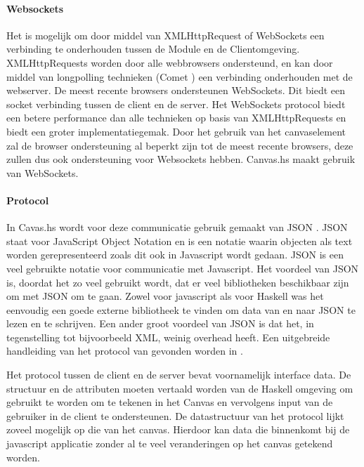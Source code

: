 \paragraph{Websockets}
Het is mogelijk om door middel van XMLHttpRequest of WebSockets een verbinding te onderhouden tussen de Module en de Clientomgeving. XMLHttpRequests worden door alle webbrowsers ondersteund, en kan door middel van longpolling technieken (Comet \cite{comet2007}) een verbinding onderhouden met de webserver. De meest recente browsers ondersteunen WebSockets. Dit biedt een socket verbinding tussen de client en de server. Het WebSockets protocol biedt een betere performance dan alle technieken op basis van XMLHttpRequests en biedt een groter implementatiegemak. Door het gebruik van het canvaselement zal de browser ondersteuning al beperkt zijn tot de meest recente browsers, deze zullen dus ook ondersteuning voor Websockets hebben. Canvas.hs maakt gebruik van WebSockets.

\paragraph{Protocol}
In Cavas.hs wordt voor deze communicatie gebruik gemaakt van JSON \cite{JSON2006}. JSON staat voor JavaScript Object Notation en is een notatie waarin objecten als text worden gerepresenteerd zoals dit ook in Javascript wordt gedaan. JSON is een veel gebruikte notatie voor communicatie met Javascript. Het voordeel van JSON is, doordat het zo veel gebruikt wordt, dat er veel bibliotheken beschikbaar zijn om met JSON om te gaan. Zowel voor javascript als voor Haskell was het eenvoudig een goede externe bibliotheek te vinden om data van en naar JSON te lezen en te schrijven. Een ander groot voordeel van JSON is dat het, in tegenstelling tot bijvoorbeeld XML, weinig overhead heeft. Een uitgebreide handleiding van het protocol van gevonden worden in \cite{Protocol2013}.

Het protocol tussen de client en de server bevat voornamelijk interface data. De structuur en de attributen moeten vertaald worden van de Haskell omgeving om gebruikt te worden om te tekenen in het Canvas en vervolgens input van de gebruiker in de client te ondersteunen. De datastructuur van het protocol lijkt zoveel mogelijk op die van het canvas. Hierdoor kan data die binnenkomt bij de javascript applicatie zonder al te veel veranderingen op het canvas getekend worden.

